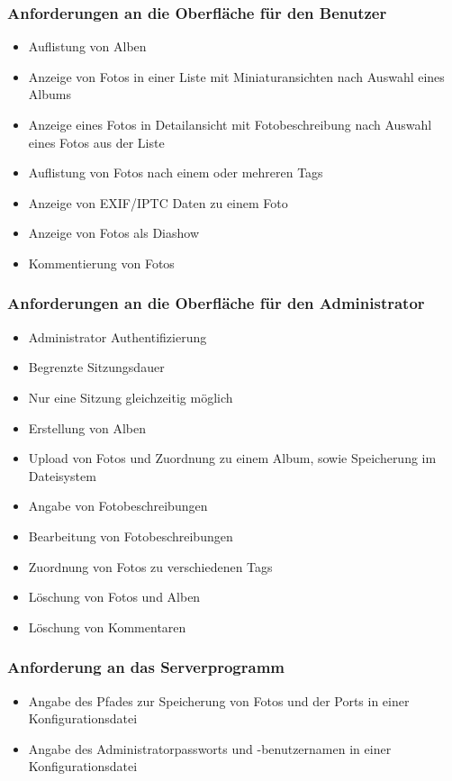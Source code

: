 \documentclass[a4paper,12pt,liststotocnumbered]{scrartcl}
\begin{document}
\subsubsection{Anforderungen an die Oberfläche für den Benutzer}

\begin{itemize}
	\item Auflistung von Alben
	\item Anzeige von Fotos in einer Liste mit Miniaturansichten nach
		Auswahl eines Albums
	\item Anzeige eines Fotos in Detailansicht mit Fotobeschreibung nach
		Auswahl eines Fotos aus der Liste
	\item Auflistung von Fotos nach einem oder mehreren Tags
	\item Anzeige von EXIF/IPTC Daten zu einem Foto
	\item Anzeige von Fotos als Diashow
	\item Kommentierung von Fotos
\end{itemize}

\subsubsection{Anforderungen an die Oberfläche für den Administrator}

\begin{itemize}
	\item Administrator Authentifizierung
	\item Begrenzte Sitzungsdauer
	\item Nur eine Sitzung gleichzeitig möglich
	\item Erstellung von Alben
	\item Upload von Fotos und Zuordnung zu einem Album, sowie Speicherung
		im Dateisystem
	\item Angabe von Fotobeschreibungen
	\item Bearbeitung von Fotobeschreibungen
	\item Zuordnung von Fotos zu verschiedenen Tags
	\item Löschung von Fotos und Alben
	\item Löschung von Kommentaren
\end{itemize}

\subsubsection{Anforderung an das Serverprogramm}

\begin{itemize}
	\item Angabe des Pfades zur Speicherung von Fotos und der Ports  in
		einer Konfigurationsdatei
	\item Angabe des Administratorpassworts und -benutzernamen in einer
		Konfigurationsdatei
\end{itemize}
\end{document}
